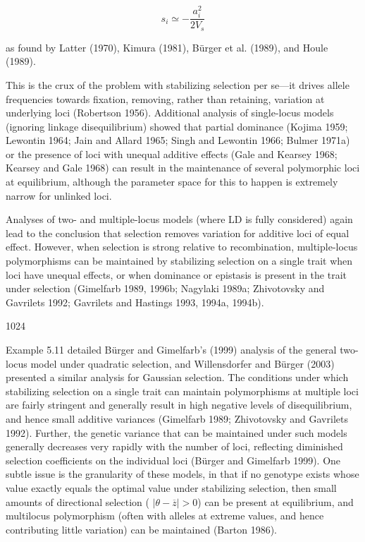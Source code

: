 \documentclass{article}
\begin{document}
\begin{equation}
s_{i}\simeq-\frac{a_{i}^{2}}{2V_{s}}
\tag{28.4c}
\label{eq:28_4c}
\end{equation}

as found by Latter (1970), Kimura (1981), Bürger et al. (1989), and Houle (1989).

This is the crux of the problem with stabilizing selection per se—it drives allele frequencies towards fixation, removing, rather than retaining, variation at underlying loci (Robertson 1956). Additional analysis of single-locus models (ignoring linkage disequilibrium) showed that partial dominance (Kojima 1959; Lewontin 1964; Jain and Allard 1965; Singh and Lewontin 1966; Bulmer 1971a) or the presence of loci with unequal additive effects (Gale and Kearsey 1968; Kearsey and Gale 1968) can result in the maintenance of several polymorphic loci at equilibrium, although the parameter space for this to happen is extremely narrow for unlinked loci.

Analyses of two- and multiple-locus models (where LD is fully considered) again lead to the conclusion that selection removes variation for additive loci of equal effect. However, when selection is strong relative to recombination, multiple-locus polymorphisms can be maintained by stabilizing selection on a single trait when loci have unequal effects, or when dominance or epistasis is present in the trait under selection (Gimelfarb 1989, 1996b; Nagylaki 1989a; Zhivotovsky and Gavrilets 1992; Gavrilets and Hastings 1993, 1994a, 1994b).

1024

Example 5.11 detailed Bürger and Gimelfarb's (1999) analysis of the general two-locus model under quadratic selection, and Willensdorfer and Bürger (2003) presented a similar analysis for Gaussian selection. The conditions under which stabilizing selection on a single trait can maintain polymorphisms at multiple loci are fairly stringent and generally result in high negative levels of disequilibrium, and hence small additive variances (Gimelfarb 1989; Zhivotovsky and Gavrilets 1992). Further, the genetic variance that can be maintained under such models generally decreases very rapidly with the number of loci, reflecting diminished selection coefficients on the individual loci (Bürger and Gimelfarb 1999). One subtle issue is the granularity of these models, in that if no genotype exists whose value exactly equals the optimal value under stabilizing selection, then small amounts of directional selection ( $ | \theta - \overline{z}| > 0 $) can be present at equilibrium, and multilocus polymorphism (often with alleles at extreme values, and hence contributing little variation) can be maintained (Barton 1986).
\end{document}
